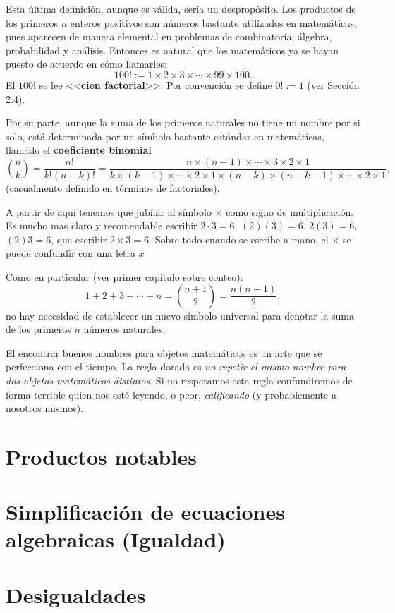 Esta última definición, aunque es válida, sería un despropósito. Los productos de los primeros $n$ enteros positivos son números bastante utilizados en matemáticas, pues aparecen de manera elemental en problemas de combinatoria, álgebra, probabilidad y análisis. Entonces es natural que los matemáticos ya se hayan puesto de acuerdo en cómo llamarles:
$$100!:=1\times 2\times 3\times \cdots \times 99\times 100.$$
El $100!$ se lee <<{\bf cien factorial}>>. Por convención se define $0!:=1$ (ver Sección 2.4).

Por su parte, aunque la suma de los primeros naturales no tiene un nombre por si solo, está determinada por un símbolo bastante estándar en matemáticas, llamado el {\bf coeficiente binomial} $${n\choose k}=\frac{n!}{k!(n-k)!}=\frac{n\times (n-1)\times \cdots \times 3\times2\times1}{k\times(k-1)\times \cdots \times 2\times 1\times (n-k)\times(n-k-1)\times \cdots \times 2\times 1},$$
(casualmente definido en términos de factoriales).

A partir de aquí tenemos que jubilar al símbolo $\times$ como signo de multiplicación. Es mucho mas claro y recomendable escribir $2\cdot 3 = 6$, $(2)(3)=6$, $2(3)=6$, $(2)3=6$, que escribir $2\times 3 = 6$. Sobre todo cuando se escribe a mano, el $\times$ se puede confundir con una letra $x$ 

Como en particular (ver primer capítulo sobre conteo): $$1+2+3+\cdots+n={n+1\choose 2}=\frac{n(n+1)}{2},$$
no hay necesidad de establecer un nuevo símbolo universal para denotar la suma de los primeros $n$ números naturales.

El encontrar buenos nombres para objetos matemáticos es un arte que se perfecciona con el tiempo. La regla dorada es \emph{no repetir el mismo nombre para dos objetos matemáticos distintos}. Si no respetamos esta regla confundiremos de forma terrible quien nos esté leyendo, o peor, \emph{calificando} (y probablemente a nosotros mismos).

\section{Productos notables}

\section{Simplificación de ecuaciones algebraicas (Igualdad)}

\section{Desigualdades}


